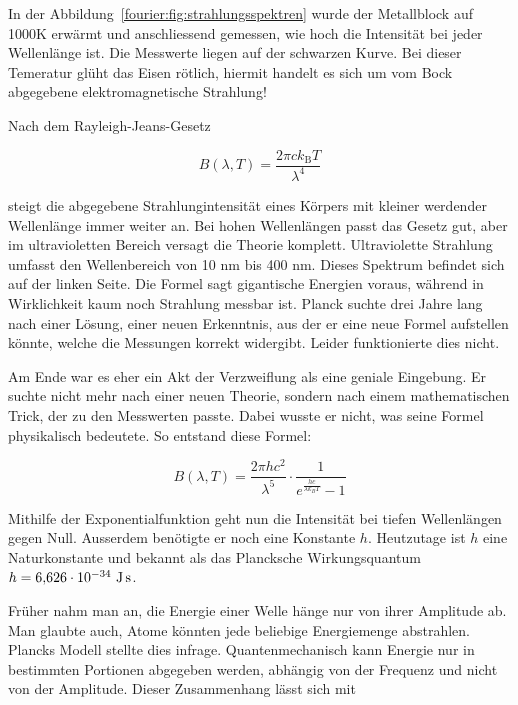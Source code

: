 	
	
	In der Abbildung~\ref{fourier:fig:strahlungsspektren} wurde der Metallblock auf 1000K erwärmt und anschliessend gemessen, wie hoch die Intensität bei jeder Wellenlänge ist. 
	Die Messwerte liegen auf der schwarzen Kurve.
	Bei dieser Temeratur glüht das Eisen rötlich, hiermit handelt es sich um vom Bock abgegebene elektromagnetische Strahlung!
	
	
	Nach dem Rayleigh-Jeans-Gesetz 
	
	\begin{equation}
		B(\lambda, T) = \frac{2 \pi c k_\mathrm{B} T}{\lambda^4}
	\end{equation}
	
	steigt die abgegebene Strahlungintensität eines Körpers mit kleiner werdender Wellenlänge immer weiter an. 
	Bei hohen Wellenlängen passt das Gesetz gut, aber im ultravioletten Bereich versagt die Theorie komplett. Ultraviolette Strahlung umfasst den Wellenbereich von 10 nm bis 400 nm. 
	Dieses Spektrum befindet sich auf der linken Seite.
	Die Formel sagt gigantische Energien voraus, während in Wirklichkeit kaum noch Strahlung messbar ist.
	Planck suchte drei Jahre lang nach einer Lösung, einer neuen Erkenntnis, aus der er eine neue Formel aufstellen könnte, welche die Messungen korrekt widergibt. 
	Leider funktionierte dies nicht.
	
	
	Am Ende war es eher ein Akt der Verzweiflung als eine geniale Eingebung. Er suchte nicht mehr nach einer neuen Theorie, sondern nach einem mathematischen Trick, der zu den Messwerten passte. 
	Dabei wusste er nicht, was seine Formel physikalisch bedeutete.
	So entstand diese Formel: 
	
	\begin{equation}
		B(\lambda, T) = \frac{2 \pi h c^2}{\lambda^5} \cdot \frac{1}{e^{\frac{h c}{\lambda k_B T}} - 1}
	\end{equation}
	
	Mithilfe der Exponentialfunktion geht nun die Intensität bei tiefen Wellenlängen gegen Null. Ausserdem benötigte er noch eine Konstante $h$. Heutzutage ist $h$ eine Naturkonstante und bekannt als das Plancksche Wirkungsquantum $h = 6{,}626 \cdot 10^{-34} \ \text{J\,s}$. 
	


	
	
	
	Früher nahm man an, die Energie einer Welle hänge nur von ihrer Amplitude ab. 
	Man glaubte auch, Atome könnten jede beliebige Energiemenge abstrahlen. 
	Plancks Modell stellte dies infrage. 
	Quantenmechanisch kann Energie nur in bestimmten Portionen abgegeben werden, abhängig von der Frequenz und nicht von der Amplitude. 
	Dieser Zusammenhang lässt sich mit
	
